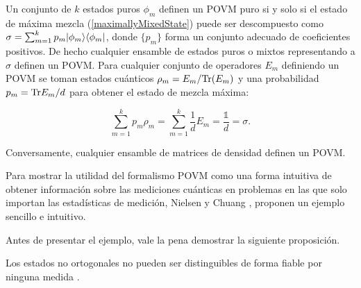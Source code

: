 Un conjunto de $k$ estados puros $\phi_m$ definen un POVM puro si y solo si el estado de máxima  mezcla (\ref{maximallyMixedState}) puede ser descompuesto como  $\sigma=\sum_{m=1}^{k}p_m|\phi_m\rangle \langle\phi_m|$, donde $\{p_m\}$ forma un conjunto adecuado de coeficientes positivos. De hecho cualquier ensamble de estados puros o mixtos representando a $\sigma$ definen un POVM\@. Para cualquier conjunto de operadores $E_m$ definiendo un POVM se toman estados cuánticos $\rho_m=E_m/{\rm Tr}(E_m)$ y una probabilidad $p_m={\rm Tr} E_m/d$ para obtener el estado de mezcla máxima:

\begin{equation}
	\sum_{m=1}^{k} p_m\rho _{m}=\sum_{m=1}^k \dfrac{1}{d}E_m=\dfrac{\mathds{1}}{d}=\sigma.
\end{equation}

Conversamente, cualquier ensamble de matrices de densidad definen un POVM{\cite{2007geometry}}.


Para mostrar la utilidad del formalismo POVM como una forma intuitiva de obtener información sobre las mediciones cuánticas en problemas en las que solo importan las estadísticas de medición, Nielsen y Chuang {\cite{nielsen_chuang_2010}}, proponen un ejemplo sencillo e intuitivo.

Antes de presentar el ejemplo, vale la pena demostrar la siguiente proposición.

\begin{proposition}Los estados no ortogonales no pueden ser distinguibles de forma fiable por ninguna medida {\cite{nielsen_chuang_2010}}.
\end{proposition}

